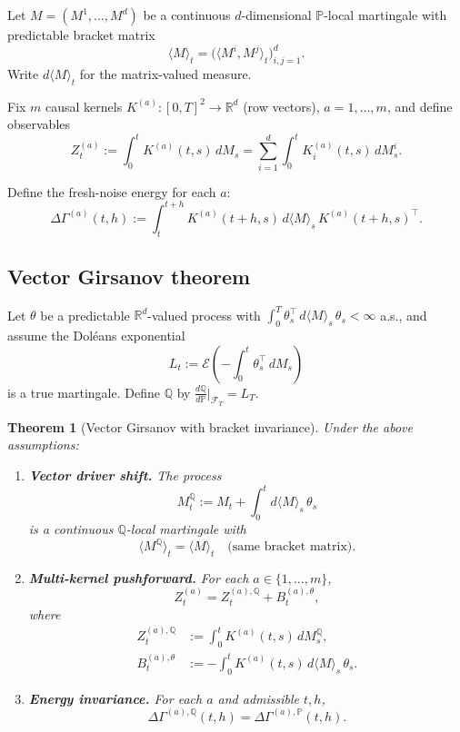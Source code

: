 \documentclass[11pt]{article}
\theoremstyle{plain}
\newtheorem{theorem}{Theorem}[section]
\theoremstyle{definition}
\theoremstyle{remark}
\newcommand{\R}{\mathbb{R}}
\newcommand{\F}{\mathcal{F}}
\newcommand{\PP}{\mathbb{P}}
\newcommand{\QQ}{\mathbb{Q}}
\newcommand{\dGamma}{\Delta\Gamma}
\newcommand{\bracket}[1]{\langle #1 \rangle}
\begin{document}
Let $M = (M^1, \ldots, M^d)$ be a continuous $d$-dimensional $\PP$-local
martingale with predictable bracket matrix
\[
\bracket{M}_t = \big(\bracket{M^i, M^j}_t\big)_{i,j=1}^d.
\]
Write $d\bracket{M}_t$ for the matrix-valued measure.

Fix $m$ causal kernels $K^{(a)} : [0,T]^2 \to \R^d$ (row vectors), $a = 1, \ldots, m$,
and define observables
\[
Z_t^{(a)} := \int_0^t K^{(a)}(t,s)\,dM_s = \sum_{i=1}^d \int_0^t K^{(a)}_i(t,s)\,dM_s^i.
\]

Define the fresh-noise energy for each $a$:
\[
\dGamma^{(a)}(t,h) := \int_t^{t+h} K^{(a)}(t+h,s)\,d\bracket{M}_s\,K^{(a)}(t+h,s)^\top.
\]

\subsection{Vector Girsanov theorem}

Let $\theta$ be a predictable $\R^d$-valued process with
$\int_0^T \theta_s^\top\,d\bracket{M}_s\,\theta_s < \infty$ a.s., and assume
the Dol\'eans exponential
\[
L_t := \mathcal{E}\left(-\int_0^t \theta_s^\top\,dM_s\right)
\]
is a true martingale. Define $\QQ$ by $\frac{d\QQ}{d\PP}|_{\F_T} = L_T$.

\begin{theorem}[Vector Girsanov with bracket invariance]\label{thm:girsanov-vector}
Under the above assumptions:

\begin{enumerate}[label=(\arabic*)]
\item \textbf{Vector driver shift.} The process
\[
M_t^{\QQ} := M_t + \int_0^t d\bracket{M}_s\,\theta_s
\]
is a continuous $\QQ$-local martingale with
\[
\bracket{M^{\QQ}}_t = \bracket{M}_t \quad \text{(same bracket matrix)}.
\]

\item \textbf{Multi-kernel pushforward.} For each $a \in \{1, \ldots, m\}$,
\begin{equation}\label{eq:Za-decomp}
Z_t^{(a)} = Z_t^{(a),\QQ} + B_t^{(a),\theta},
\end{equation}
where
\begin{align*}
Z_t^{(a),\QQ} &:= \int_0^t K^{(a)}(t,s)\,dM_s^{\QQ}, \\
B_t^{(a),\theta} &:= -\int_0^t K^{(a)}(t,s)\,d\bracket{M}_s\,\theta_s.
\end{align*}

\item \textbf{Energy invariance.} For each $a$ and admissible $t, h$,
\[
\dGamma^{(a),\QQ}(t,h) = \dGamma^{(a),\PP}(t,h).
\]
\end{enumerate}
\end{theorem}
\end{document}
